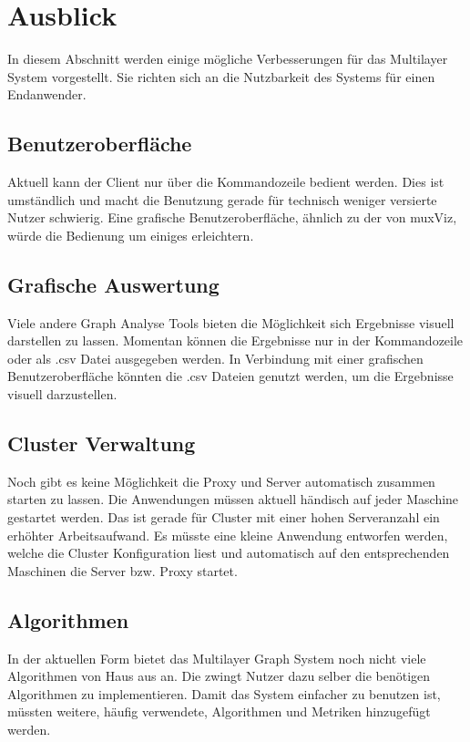 \section{Ausblick}

In diesem Abschnitt werden einige mögliche Verbesserungen für das Multilayer System vorgestellt.
Sie richten sich an die Nutzbarkeit des Systems für einen Endanwender.


\subsection{Benutzeroberfläche}

Aktuell kann der Client nur über die Kommandozeile bedient werden. Dies ist umständlich und macht die Benutzung gerade für technisch weniger versierte Nutzer schwierig.
Eine grafische Benutzeroberfläche, ähnlich zu der von muxViz, würde die Bedienung um einiges erleichtern. 

\subsection{Grafische Auswertung}

Viele andere Graph Analyse Tools bieten die Möglichkeit sich Ergebnisse visuell darstellen zu lassen. Momentan können die Ergebnisse nur in der Kommandozeile oder als .csv Datei ausgegeben werden.
In Verbindung mit einer grafischen Benutzeroberfläche könnten die .csv Dateien genutzt werden, um die Ergebnisse visuell darzustellen.

\subsection{Cluster Verwaltung}

Noch gibt es keine Möglichkeit die Proxy und Server automatisch zusammen starten zu lassen. Die Anwendungen müssen aktuell händisch auf jeder Maschine gestartet werden. Das ist gerade für Cluster mit einer hohen Serveranzahl ein erhöhter Arbeitsaufwand.
Es müsste eine kleine Anwendung entworfen werden, welche die Cluster Konfiguration liest und automatisch auf den entsprechenden Maschinen die Server bzw. Proxy startet.

\subsection{Algorithmen}

In der aktuellen Form bietet das Multilayer Graph System noch nicht viele Algorithmen von Haus aus an. Die zwingt Nutzer dazu selber die benötigen Algorithmen zu implementieren. Damit das System einfacher zu benutzen ist,
müssten weitere, häufig verwendete, Algorithmen und Metriken hinzugefügt werden.


